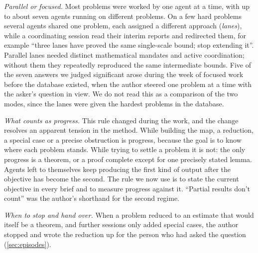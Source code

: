 \documentclass[11pt]{amsart}
\begin{document}
\emph{Parallel or focused.} Most problems were worked by one agent at a time,
with up to about seven agents running on different problems. On a few hard
problems several agents shared one problem, each assigned a different approach
(\emph{lanes}), while a coordinating session read their interim reports and
redirected them, for example ``three lanes have proved the same single-scale
bound; stop extending it''. Parallel lanes needed distinct mathematical
mandates and active coordination; without them they repeatedly reproduced the
same intermediate bounds. Five of the seven answers we judged significant arose
during the week of focused work before the database existed, when the author
steered one problem at a time with the asker's question in view. We do not read
this as a comparison of the two modes, since the lanes were given the hardest
problems in the database.\@

\emph{What counts as progress.} This rule changed during the work, and the
change resolves an apparent tension in the method. While building the map, a
reduction, a special case or a precise obstruction is progress, because the
goal is to know where each problem stands. While trying to settle a problem it
is not: the only progress is a theorem, or a proof complete except for one
precisely stated lemma. Agents left to themselves keep producing the first kind
of output after the objective has become the second. The rule we now use is to
state the current objective in every brief and to measure progress against it.
``Partial results don't count'' was the author's shorthand for the second
regime.\@

\emph{When to stop and hand over.} When a problem reduced to an estimate that
would itself be a theorem, and further sessions only added special cases, the
author stopped and wrote the reduction up for the person who had asked the
question (\cref{sec:episodes}).
\end{document}
